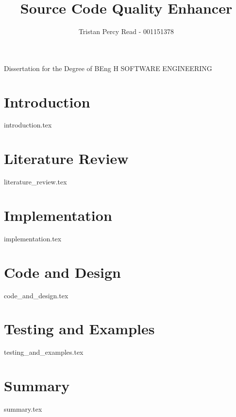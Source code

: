 \documentclass{COMPXXXX} %
\begin{document}

\title{Source Code Quality Enhancer} %
\author{Tristan Percy Read - 001151378} %

\maketitle %
{
	\centering
	Dissertation for the Degree of BEng H SOFTWARE ENGINEERING

} %

\section*{Introduction}
{introduction.tex}

\section*{Literature Review}
{literature_review.tex}

\section*{Implementation}
{implementation.tex}

\section*{Code and Design}
{code_and_design.tex}

\section*{Testing and Examples}
{testing_and_examples.tex}

\section*{Summary}
{summary.tex}


% 
\end{document}

